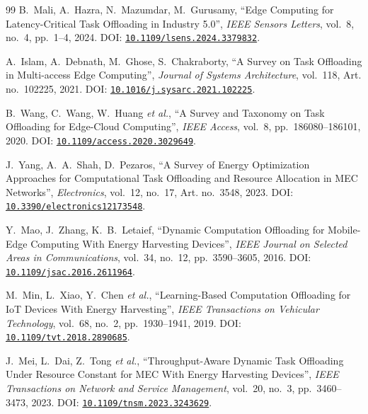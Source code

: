 \documentclass[conference]{IEEEtran}
\begin{document}
\begin{thebibliography}{99}
 B.~Mali, A.~Hazra, N.~Mazumdar, M.~Gurusamy, ``Edge Computing for Latency-Critical Task Offloading in Industry 5.0'', \emph{IEEE Sensors Letters}, vol.~8, no.~4, pp.~1--4, 2024. DOI: \href{https://doi.org/10.1109/lsens.2024.3379832}{\nolinkurl{10.1109/lsens.2024.3379832}}.

 A.~Islam, A.~Debnath, M.~Ghose, S.~Chakraborty, ``A Survey on Task Offloading in Multi-access Edge Computing'', \emph{Journal of Systems Architecture}, vol.~118, Art. no.~102225, 2021. DOI: \href{https://doi.org/10.1016/j.sysarc.2021.102225}{\nolinkurl{10.1016/j.sysarc.2021.102225}}.

 B.~Wang, C.~Wang, W.~Huang \emph{et al.}, ``A Survey and Taxonomy on Task Offloading for Edge-Cloud Computing'', \emph{IEEE Access}, vol.~8, pp.~186080--186101, 2020. DOI: \href{https://doi.org/10.1109/access.2020.3029649}{\nolinkurl{10.1109/access.2020.3029649}}.

 J.~Yang, A.~A.~Shah, D.~Pezaros, ``A Survey of Energy Optimization Approaches for Computational Task Offloading and Resource Allocation in MEC Networks'', \emph{Electronics}, vol.~12, no.~17, Art. no.~3548, 2023. DOI: \href{https://doi.org/10.3390/electronics12173548}{\nolinkurl{10.3390/electronics12173548}}.

 Y.~Mao, J.~Zhang, K.~B.~Letaief, ``Dynamic Computation Offloading for Mobile-Edge Computing With Energy Harvesting Devices'', \emph{IEEE Journal on Selected Areas in Communications}, vol.~34, no.~12, pp.~3590--3605, 2016. DOI: \href{https://doi.org/10.1109/jsac.2016.2611964}{\nolinkurl{10.1109/jsac.2016.2611964}}.

 M.~Min, L.~Xiao, Y.~Chen \emph{et al.}, ``Learning-Based Computation Offloading for IoT Devices With Energy Harvesting'', \emph{IEEE Transactions on Vehicular Technology}, vol.~68, no.~2, pp.~1930--1941, 2019. DOI: \href{https://doi.org/10.1109/tvt.2018.2890685}{\nolinkurl{10.1109/tvt.2018.2890685}}.

 J.~Mei, L.~Dai, Z.~Tong \emph{et al.}, ``Throughput-Aware Dynamic Task Offloading Under Resource Constant for MEC With Energy Harvesting Devices'', \emph{IEEE Transactions on Network and Service Management}, vol.~20, no.~3, pp.~3460--3473, 2023. DOI: \href{https://doi.org/10.1109/tnsm.2023.3243629}{\nolinkurl{10.1109/tnsm.2023.3243629}}.


\end{thebibliography}
\end{document}
